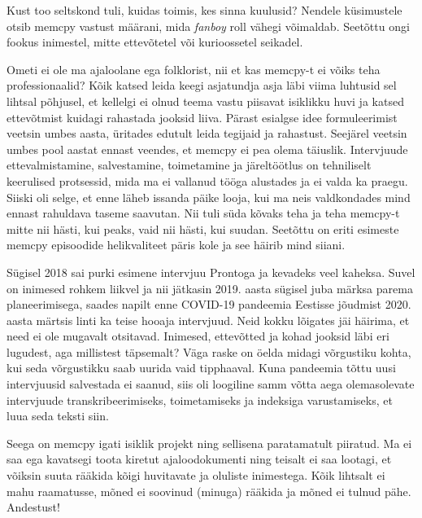 Kust too seltskond tuli, kuidas toimis, kes sinna kuulusid? Nendele küsimustele 
otsib memcpy vastust määrani, mida \emph{fanboy} roll vähegi võimaldab. Seetõttu ongi 
fookus inimestel, mitte ettevõtetel 
või kurioossetel seikadel. 

Ometi ei ole ma ajaloolane ega folklorist, nii et kas memcpy-t ei võiks teha 
professionaalid? Kõik katsed leida keegi asjatundja asja läbi viima luhtusid 
sel lihtsal põhjusel, et kellelgi ei olnud teema vastu piisavat isiklikku huvi 
ja katsed ettevõtmist kuidagi rahastada jooksid liiva. Pärast esialgse 
idee formuleerimist veetsin umbes aasta, üritades edutult leida tegijaid ja 
rahastust. Seejärel veetsin umbes pool aastat ennast veendes, et memcpy ei pea 
olema täiuslik. Intervjuude ettevalmistamine, salvestamine, toimetamine ja 
järeltöötlus on tehniliselt keerulised protsessid, mida ma ei vallanud tööga alustades ja 
ei valda ka praegu. Siiski oli selge, et enne läheb issanda päike looja, kui ma 
neis valdkondades mind ennast rahuldava taseme saavutan. Nii tuli süda kõvaks teha ja teha memcpy-t 
mitte nii hästi, kui peaks, vaid nii hästi, kui suudan. Seetõttu on 
eriti esimeste memcpy episoodide helikvaliteet päris kole ja see häirib mind 
siiani.

Sügisel 2018 sai purki esimene intervjuu Prontoga ja 
kevadeks veel kaheksa. Suvel on inimesed rohkem liikvel ja nii jätkasin 
2019. aasta sügisel juba märksa parema planeerimisega, saades napilt enne COVID-19 
pandeemia Eestisse jõudmist 2020. aasta märtsis linti ka teise hooaja 
intervjuud. Neid kokku lõigates jäi häirima, et need ei ole mugavalt 
otsitavad. Inimesed, ettevõtted ja kohad jooksid läbi eri lugudest, aga 
millistest täpsemalt? Väga raske on öelda midagi võrgustiku kohta, kui seda võrgustikku 
saab uurida vaid tipphaaval. Kuna pandeemia tõttu uusi intervjuusid salvestada ei 
saanud, siis oli loogiline samm võtta aega olemasolevate intervjuude
transkribeerimiseks, toimetamiseks ja indeksiga varustamiseks, et luua
seda teksti siin. 

Seega on memcpy igati isiklik projekt ning sellisena paratamatult 
piiratud. Ma ei saa ega kavatsegi toota kiretut ajaloodokumenti ning teisalt ei saa lootagi, et võiksin suuta rääkida kõigi 
huvitavate ja oluliste inimestega. Kõik lihtsalt ei mahu raamatusse, mõned ei 
soovinud (minuga) rääkida ja mõned ei tulnud pähe. Andestust! 

